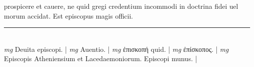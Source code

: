 \documentclass{article}
\begin{document}
\begin{pages}
prospicere et cauere, ne quid gregi credentium incommodi in doctrina fidei uel morum accidat. Est episcopus magis officii.  \pend
\vspace{0.5cm}\noindent
\vspace{0.2cm}\rule{1cm}{0.2pt}\\ 
\hspace{0.2cm}\textit{mg}
\footnotesize Deuita episcopi. 
\normalsize| 
\hspace{0.2cm}\textit{mg}
\footnotesize Auentio. 
\normalsize| 
\hspace{0.2cm}\textit{mg}
\footnotesize ἐπισκοπή quid. 
\normalsize| 
\hspace{0.2cm}\textit{mg}
\footnotesize ἐπίσκοπος. 
\normalsize| 
\hspace{0.2cm}\textit{mg}
\footnotesize Episcopis Atheniensium et Lacedaemoniorum. Episcopi munus. 
\normalsize| 
\endnumbering
\end{pages}
\end{document}
